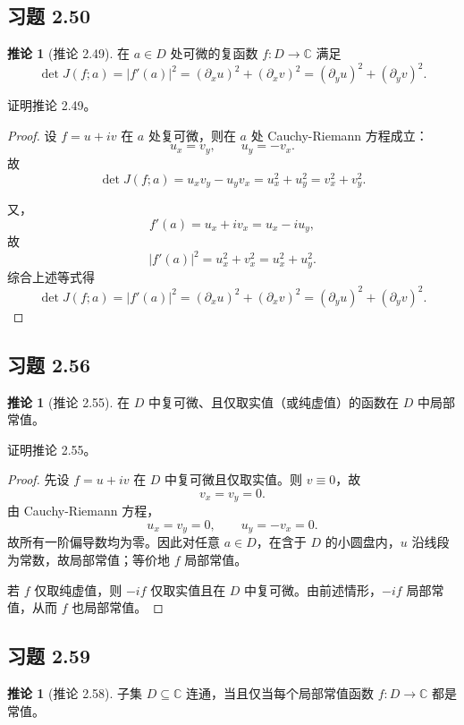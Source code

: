 \documentclass[11pt,a4paper]{article}
\newcommand{\C}{\mathbb{C}}
\theoremstyle{definition}
\newtheorem{corollary}[theorem]{推论}
\begin{document}
\subsection{习题 2.50}

\begin{corollary}[推论 2.49]
  在 $a \in D$ 处可微的复函数 $f : D \to \C$ 满足
  \[
    \det J(f;a) = |f'(a)|^2
    = (\partial_x u)^2 + (\partial_x v)^2
    = (\partial_y u)^2 + (\partial_y v)^2.
  \]
\end{corollary}

证明推论 2.49。

\begin{proof}
设 $f=u+iv$ 在 $a$ 处复可微，则在 $a$ 处 Cauchy-Riemann 方程成立：
\[
  u_x=v_y,\qquad u_y=-v_x.
\]
故
\[
  \det J(f;a)=u_x v_y-u_y v_x=u_x^2+u_y^2=v_x^2+v_y^2.
\]

又，
\[
  f'(a)=u_x+i v_x=u_x-i u_y,
\]
故
\[
  |f'(a)|^2=u_x^2+v_x^2=u_x^2+u_y^2.
\]
综合上述等式得
\[
  \det J(f;a)=|f'(a)|^2
  =(\partial_x u)^2+(\partial_x v)^2
  =(\partial_y u)^2+(\partial_y v)^2.
\]
\end{proof}

\subsection{习题 2.56}

\begin{corollary}[推论 2.55]
  在 $D$ 中复可微、且仅取实值（或纯虚值）的函数在 $D$ 中局部常值。
\end{corollary}

证明推论 2.55。

\begin{proof}
先设 $f=u+iv$ 在 $D$ 中复可微且仅取实值。则 $v\equiv 0$，故
\[
  v_x=v_y=0.
\]
由 Cauchy-Riemann 方程，
\[
  u_x=v_y=0,\qquad u_y=-v_x=0.
\]
故所有一阶偏导数均为零。因此对任意 $a\in D$，在含于 $D$ 的小圆盘内，$u$ 沿线段为常数，故局部常值；等价地 $f$ 局部常值。

若 $f$ 仅取纯虚值，则 $-if$ 仅取实值且在 $D$ 中复可微。由前述情形，$-if$ 局部常值，从而 $f$ 也局部常值。
\end{proof}

\subsection{习题 2.59}

\begin{corollary}[推论 2.58]
  子集 $D \subseteq \C$ 连通，当且仅当每个局部常值函数 $f : D \to \C$ 都是常值。
\end{corollary}
\end{document}
